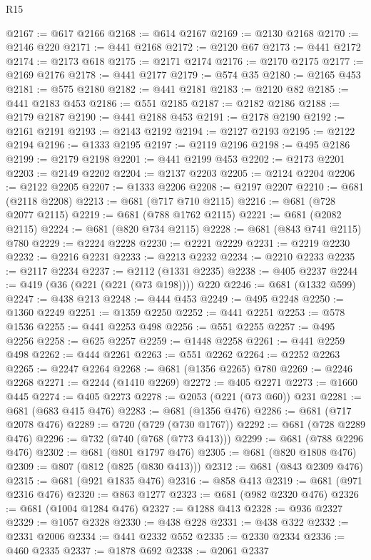 \begin{lexlean}{R15}
\begin{coremodule}
@2167 := @617 @2166
@2168 := @614 @2167
@2169 := @2130 @2168
@2170 := @2146 @220
@2171 := @441 @2168
@2172 := @2120 @67
@2173 := @441 @2172
@2174 := @2173 @618
@2175 := @2171 @2174
@2176 := @2170 @2175
@2177 := @2169 @2176
@2178 := @441 @2177
@2179 := @574 @35
@2180 := @2165 @453
@2181 := @575 @2180
@2182 := @441 @2181
@2183 := @2120 @82
@2185 := @441 @2183 @453
@2186 := @551 @2185
@2187 := @2182 @2186
@2188 := @2179 @2187
@2190 := @441 @2188 @453
@2191 := @2178 @2190
@2192 := @2161 @2191
@2193 := @2143 @2192
@2194 := @2127 @2193
@2195 := @2122 @2194
@2196 := @1333 @2195
@2197 := @2119 @2196
@2198 := @495 @2186
@2199 := @2179 @2198
@2201 := @441 @2199 @453
@2202 := @2173 @2201
@2203 := @2149 @2202
@2204 := @2137 @2203
@2205 := @2124 @2204
@2206 := @2122 @2205
@2207 := @1333 @2206
@2208 := @2197 @2207
@2210 := @681 (@2118 @2208)
@2213 := @681 (@717 @710 @2115)
@2216 := @681 (@728 @2077 @2115)
@2219 := @681 (@788 @1762 @2115)
@2221 := @681 (@2082 @2115)
@2224 := @681 (@820 @734 @2115)
@2228 := @681 (@843 @741 @2115) @780
@2229 := @2224 @2228
@2230 := @2221 @2229
@2231 := @2219 @2230
@2232 := @2216 @2231
@2233 := @2213 @2232
@2234 := @2210 @2233
@2235 := @2117 @2234
@2237 := @2112 (@1331 @2235)
@2238 := @405 @2237
@2244 := @419 (@36 (@221 (@221 (@73 @198)))) @220
@2246 := @681 (@1332 @599)
@2247 := @438 @213
@2248 := @444 @453
@2249 := @495 @2248
@2250 := @1360 @2249
@2251 := @1359 @2250
@2252 := @441 @2251
@2253 := @578 @1536
@2255 := @441 @2253 @498
@2256 := @551 @2255
@2257 := @495 @2256
@2258 := @625 @2257
@2259 := @1448 @2258
@2261 := @441 @2259 @498
@2262 := @444 @2261
@2263 := @551 @2262
@2264 := @2252 @2263
@2265 := @2247 @2264
@2268 := @681 (@1356 @2265) @780
@2269 := @2246 @2268
@2271 := @2244 (@1410 @2269)
@2272 := @405 @2271
@2273 := @1660 @445
@2274 := @405 @2273
@2278 := @2053 (@221 (@73 @60)) @231
@2281 := @681 (@683 @415 @476)
@2283 := @681 (@1356 @476)
@2286 := @681 (@717 @2078 @476)
@2289 := @720 (@729 (@730 @1767))
@2292 := @681 (@728 @2289 @476)
@2296 := @732 (@740 (@768 (@773 @413)))
@2299 := @681 (@788 @2296 @476)
@2302 := @681 (@801 @1797 @476)
@2305 := @681 (@820 @1808 @476)
@2309 := @807 (@812 (@825 (@830 @413)))
@2312 := @681 (@843 @2309 @476)
@2315 := @681 (@921 @1835 @476)
@2316 := @858 @413
@2319 := @681 (@971 @2316 @476)
@2320 := @863 @1277
@2323 := @681 (@982 @2320 @476)
@2326 := @681 (@1004 @1284 @476)
@2327 := @1288 @413
@2328 := @936 @2327
@2329 := @1057 @2328
@2330 := @438 @228
@2331 := @438 @322
@2332 := @2331 @2006
@2334 := @441 @2332 @552
@2335 := @2330 @2334
@2336 := @460 @2335
@2337 := @1878 @692
@2338 := @2061 @2337

\end{coremodule}
\end{lexlean}
